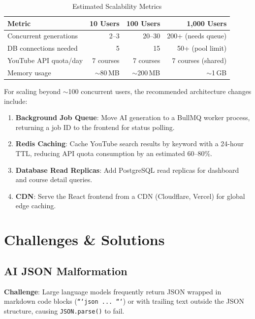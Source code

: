 \documentclass[12pt,a4paper]{report}
\begin{document}
\begin{table}[H]
\centering
\caption{Estimated Scalability Metrics}
\label{tab:scalability}
\begin{tabular}{l r r r}
\toprule
\textbf{Metric} & \textbf{10 Users} & \textbf{100 Users} & \textbf{1{,}000 Users} \\
\midrule
Concurrent generations    & 2--3        & 20--30      & 200+ (needs queue) \\
DB connections needed     & 5           & 15          & 50+ (pool limit)   \\
YouTube API quota/day     & 7 courses   & 7 courses   & 7 courses (shared) \\
Memory usage              & $\sim$80\,MB & $\sim$200\,MB & $\sim$1\,GB        \\
\bottomrule
\end{tabular}
\end{table}

For scaling beyond $\sim$100 concurrent users, the recommended architecture changes include:
\begin{enumerate}[noitemsep]
    \item \textbf{Background Job Queue}: Move AI generation to a BullMQ worker process, returning a job ID to the frontend for status polling.
    \item \textbf{Redis Caching}: Cache YouTube search results by keyword with a 24-hour TTL, reducing API quota consumption by an estimated 60--80\%.
    \item \textbf{Database Read Replicas}: Add PostgreSQL read replicas for dashboard and course detail queries.
    \item \textbf{CDN}: Serve the React frontend from a CDN (Cloudflare, Vercel) for global edge caching.
\end{enumerate}


\chapter{Challenges \& Solutions}

\section{AI JSON Malformation}
\textbf{Challenge}: Large language models frequently return JSON wrapped in markdown code blocks (\texttt{```json ... ```}) or with trailing text outside the JSON structure, causing \texttt{JSON.parse()} to fail.
\end{document}
